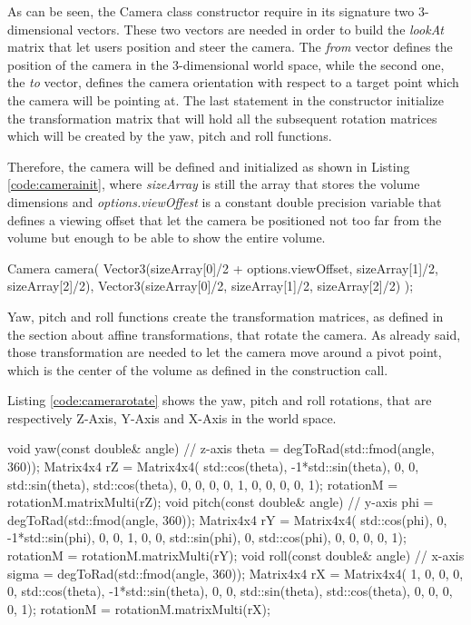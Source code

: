 \documentclass[12pt,a4paper]{extarticle}
\newcommand{\linespace}{\vspace{8pt}}
\begin{document}
As can be seen, the Camera class constructor require in its signature two 3-dimensional vectors. These two vectors are needed in order to build the \textit{lookAt} matrix that let users position and steer the camera. The \textit{from} vector defines the position of the camera in the 3-dimensional world space, while the second one, the \textit{to} vector, defines the camera orientation with respect to a target point which the camera will be pointing at.
The last statement in the constructor initialize the transformation matrix that will hold all the subsequent rotation matrices which will be created by the yaw, pitch and roll functions.
\linespace

Therefore, the camera will be defined and initialized as shown in Listing \ref{code:camerainit}, where \textit{sizeArray} is still the array that stores the volume dimensions and \textit{options.viewOffest} is a constant double precision variable that defines a viewing offset that let the camera be positioned not too far from the volume but enough to be able to show the entire volume.

\begin{cpp}[caption={Camera definition and initialization.},label=code:camerainit]
Camera camera(
	Vector3(sizeArray[0]/2 + options.viewOffset, 
		sizeArray[1]/2, sizeArray[2]/2), 
	Vector3(sizeArray[0]/2, sizeArray[1]/2, sizeArray[2]/2)
	);
\end{cpp} 

Yaw, pitch and roll functions create the transformation matrices, as defined in the section about affine transformations, that rotate the camera. As already said, those transformation are needed to let the camera move around a pivot point, which is the center of the volume as defined in the construction call.

Listing \ref{code:camerarotate} shows the yaw, pitch and roll rotations, that are respectively Z-Axis, Y-Axis and X-Axis in the world space.

\begin{cpp}[caption={},label=code:camerarotate]
void yaw(const double& angle) { // z-axis
	theta = degToRad(std::fmod(angle, 360));
	Matrix4x4 rZ = Matrix4x4(
		std::cos(theta), -1*std::sin(theta), 0, 0,
		std::sin(theta), std::cos(theta), 0, 0,
		0, 0, 1, 0,
		0, 0, 0, 1);
	rotationM = rotationM.matrixMulti(rZ);
}
void pitch(const double& angle) { // y-axis
	phi = degToRad(std::fmod(angle, 360));
	Matrix4x4 rY = Matrix4x4(
		std::cos(phi), 0, -1*std::sin(phi), 0,
		0, 1, 0, 0,
		std::sin(phi), 0, std::cos(phi), 0,
		0, 0, 0, 1);
	rotationM = rotationM.matrixMulti(rY);
}
void roll(const double& angle) { // x-axis
	sigma = degToRad(std::fmod(angle, 360));
	Matrix4x4 rX = Matrix4x4(
		1, 0, 0, 0,
		0, std::cos(theta), -1*std::sin(theta), 0,
		0, std::sin(theta), std::cos(theta), 0,
		0, 0, 0, 1);
	rotationM = rotationM.matrixMulti(rX);
}
\end{cpp}
\end{document}

